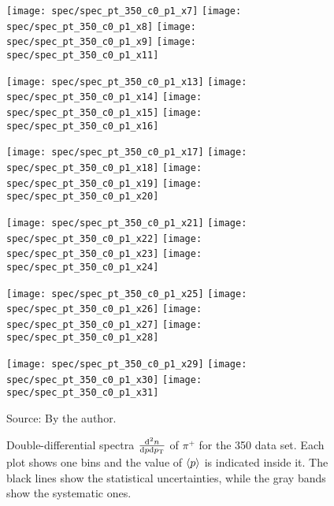 \begin{figure}[!ht]
  \centering

  \texttt{[image: spec/spec\_pt\_350\_c0\_p1\_x7]}
  \texttt{[image: spec/spec\_pt\_350\_c0\_p1\_x8]}
  \texttt{[image: spec/spec\_pt\_350\_c0\_p1\_x9]}
  \texttt{[image: spec/spec\_pt\_350\_c0\_p1\_x11]}

  \texttt{[image: spec/spec\_pt\_350\_c0\_p1\_x13]}
  \texttt{[image: spec/spec\_pt\_350\_c0\_p1\_x14]}
  \texttt{[image: spec/spec\_pt\_350\_c0\_p1\_x15]}
  \texttt{[image: spec/spec\_pt\_350\_c0\_p1\_x16]}

  \texttt{[image: spec/spec\_pt\_350\_c0\_p1\_x17]}
  \texttt{[image: spec/spec\_pt\_350\_c0\_p1\_x18]}
  \texttt{[image: spec/spec\_pt\_350\_c0\_p1\_x19]}
  \texttt{[image: spec/spec\_pt\_350\_c0\_p1\_x20]}

  \texttt{[image: spec/spec\_pt\_350\_c0\_p1\_x21]}
  \texttt{[image: spec/spec\_pt\_350\_c0\_p1\_x22]}
  \texttt{[image: spec/spec\_pt\_350\_c0\_p1\_x23]}
  \texttt{[image: spec/spec\_pt\_350\_c0\_p1\_x24]}

  \texttt{[image: spec/spec\_pt\_350\_c0\_p1\_x25]}
  \texttt{[image: spec/spec\_pt\_350\_c0\_p1\_x26]}
  \texttt{[image: spec/spec\_pt\_350\_c0\_p1\_x27]}
  \texttt{[image: spec/spec\_pt\_350\_c0\_p1\_x28]}

  \texttt{[image: spec/spec\_pt\_350\_c0\_p1\_x29]}
  \texttt{[image: spec/spec\_pt\_350\_c0\_p1\_x30]}
  \texttt{[image: spec/spec\_pt\_350\_c0\_p1\_x31]}

  \caption{Double-differential spectra $\frac{\text{d}^2n}{\text{d}p\text{d}p_\text{T}}$
    of $\pi^+$ for the 350 \GeVc data set. Each plot shows one \pp bins and the value
    of $\langle p\rangle$ is indicated inside it. The black lines show the statistical
    uncertainties, while the gray bands show the systematic ones.}
  \label{fig:hadron:spec:dedx:all350:c0p1}
  \begin{center}
    \small Source: By the author. 
  \end{center}
\end{figure}


